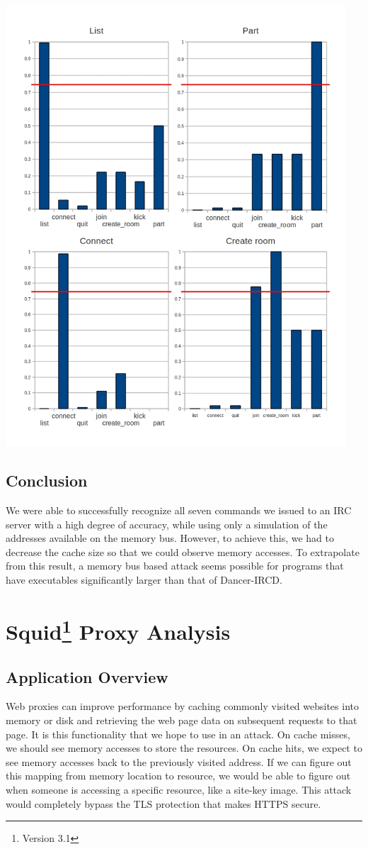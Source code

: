 \documentclass[11pt, oneside]{article}
\begin{document}
\includegraphics[height=6.47in, width=5in]{irc2.jpg}

\subsection{Conclusion}
We were able to successfully recognize all seven commands we issued to an IRC 
server with a high degree of accuracy, while using only a simulation of the 
addresses available on the memory bus. However, to achieve this, we had to 
decrease the cache size so that we could observe memory accesses. To 
extrapolate from this result, a memory bus based attack seems possible for 
programs that have executables significantly larger than that of Dancer-IRCD. 

\section[Squid Proxy Analysis]{Squid\footnote{Version 3.1} Proxy Analysis}
\subsection{Application Overview}
Web proxies can improve performance by caching commonly visited websites 
into memory or disk and retrieving the web page data on subsequent requests 
to that page. It is this functionality that we hope to use in an attack. On 
cache misses, we should see memory accesses to store the resources. On 
cache hits, we expect to see memory accesses back to the previously visited
address. If we can figure out this mapping from memory location to resource,
we would be able to figure out when someone is accessing a specific resource, 
like a site-key image. This attack would completely bypass the TLS protection
that makes HTTPS secure.
\end{document}
